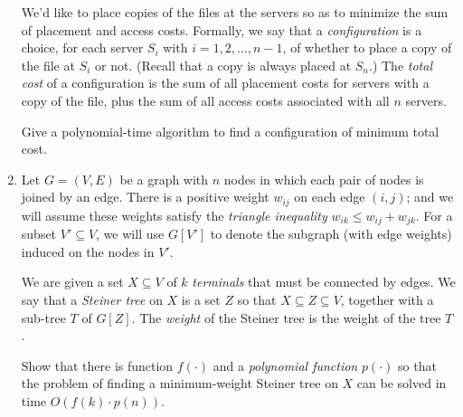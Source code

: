 \documentclass[12pt]{article}
\begin{document}
\begin{enumerate}
We'd like to place copies of the files at the servers so as to
minimize the sum of placement and access costs.
Formally, we say that a {\em configuration} is a choice,
for each server $S_i$ with $i = 1, 2, \ldots, n-1$,
of whether to place a copy of the file at $S_i$ or not.
(Recall that a copy is always placed at $S_n$.)
The {\em total cost} of a configuration is the sum of
all placement costs for servers with a copy of the file,
plus the sum of all access costs associated with all $n$ servers.

Give a polynomial-time algorithm to find a configuration
of minimum total cost.




\item\Star
Let $G = (V,E)$ be a graph
with $n$ nodes in which
each pair of nodes is joined by an edge.
There is a positive weight $w_{ij}$ on each edge $(i,j)$;
and we will assume these weights satisfy the
{\em triangle inequality}
$w_{ik} \leq w_{ij} + w_{jk}.$
For a subset $V' \subseteq V$, we will use $G[V']$
to denote the subgraph (with edge weights) induced on
the nodes in $V'$.

We are given a set $X \subseteq V$ of $k$ {\em terminals}
that must be connected by edges.
We say that a {\em Steiner tree} on $X$ is a set
$Z$ so that $X \subseteq Z \subseteq V$,
together with a sub-tree $T$ of $G[Z]$.
The {\em weight} of the Steiner tree is the weight of the tree $T$.

Show that there is function $f(\cdot)$ and a
{\em polynomial function} $p(\cdot)$
so that the
problem of finding a minimum-weight
Steiner tree on $X$ can be solved in time $O(f(k) \cdot p(n))$.


\end{enumerate}
\end{document}
